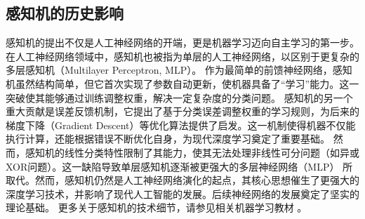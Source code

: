 \subsection{ 感知机的历史影响}
感知机的提出不仅是人工神经网络的开端，更是机器学习迈向自主学习的第一步。
在人工神经网络领域中，感知机也被指为单层的人工神经网络，以区别于更复杂的多层感知机（Multilayer Perceptron, MLP）。
作为最简单的前馈神经网络，感知机虽然结构简单，但它首次实现了参数自动更新，使机器具备了“学习”能力。这一突破使其能够通过训练调整权重，解决一定复杂度的分类问题。
感知机的另一个重大贡献是误差反馈机制，它提出了基于分类误差调整权重的学习规则，为后来的梯度下降（Gradient Descent）等优化算法提供了启发。这一机制使得机器不仅能执行计算，还能根据错误不断优化自身，为现代深度学习奠定了重要基础。
然而，感知机的线性分类特性限制了其能力，使其无法处理非线性可分问题（如异或 XOR问题）。这一缺陷导致单层感知机逐渐被更强大的多层神经网络（MLP） 所取代。然而，感知机仍然是人工神经网络演化的起点，其核心思想催生了更强大的深度学习技术，并影响了现代人工智能的发展。后续神经网络的发展奠定了坚实的理论基础。
更多关于感知机的技术细节，请参见相关机器学习教材 \cite{张玉宏2018}。
